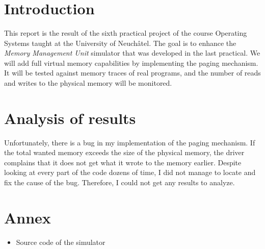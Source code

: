 \documentclass[11pt,a4paper]{scrartcl}
\author{\myauthor}
\title{\huge \textbf{\mytitle}}
\begin{document}
\begin{otherlanguage}{australian}
\maketitle
\end{otherlanguage}

\section*{Introduction}

This report is the result of the sixth practical project of the course Operating Systems taught at the University of Neuchâtel. The goal is to enhance the \textit{Memory Management Unit} simulator that was developed in the last practical. We will add full virtual memory capabilities by implementing the paging mechanism. It will be tested against memory traces of real programs, and the number of reads and writes to the physical memory will be monitored.

\section*{Analysis of results}

Unfortunately, there is a bug in my implementation of the paging mechanism. If the total wanted memory exceeds the size of the physical memory, the driver complains that it does not get what it wrote to the memory earlier. Despite looking at every part of the code dozens of time, I did not manage to locate and fix the cause of the bug. Therefore, I could not get any results to analyze.

\section*{Annex}

\begin{itemize}
\item Source code of the simulator
\end{itemize}
\end{document}
